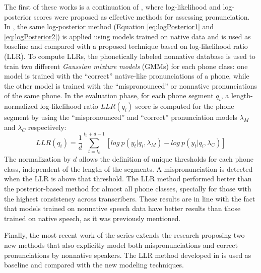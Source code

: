 The first of these works \cite{detection_phone_level_mispronunciation_learning} is
a continuation of \cite{pronunciation_scoring_phone_segments_instruction},
where log-likelihood and log-posterior scores were proposed as effective methods for
assessing pronunciation. In \cite{detection_phone_level_mispronunciation_learning},
the same log-posterior method (Equation \ref{eq:logPosterior1} and \ref{eq:logPosterior2})
is applied using models trained on native
data and is used as baseline and compared with a proposed technique
based on log-likelihood ratio (LLR).
To compute LLRs, the phonetically labeled nonnative
database is used to train two different \textit{Gaussian mixture models} (GMMs) for each phone
class: one model is trained with the ``correct'' native-like pronunciations of a phone, while the
other model is trained with the ``mispronounced'' or nonnative pronunciations of the same phone.
In the evaluation phase, for each phone segment $q_{i}$, a length-normalized log-likelihood ratio
$LLR(q_{i})$ score is computed for the phone segment by using the ``mispronounced'' and ``correct''
pronunciation models $\lambda_{M}$ and $\lambda_{C}$ respectively:
\begin{equation}
\label{eq:logLikelihoodRatio}
LLR(q_{i}) = \frac{1}{d}\sum_{t=t_{0}}^{t_{0}+d-1} [log \ p(y_{t}|q_{i}, \lambda_{M}) - log \ p(y_{t}|q_{i}, \lambda_{C})]
\end{equation}
The normalization by $d$ allows the definition of unique thresholds for each phone class,
independent of the length of the segments. A mispronunciation is detected when the LLR is above that threshold.
The LLR method performed better than the posterior-based method for almost all phone classes,
specially for those with the highest consistency across transcribers. These results are in
line with the fact that models trained on nonnative speech data have better results than
those trained on native speech, as it was previously mentioned.

Finally, the most recent work of the series \cite{main} extends the research
proposing two new methods that also explicitly model both mispronunciations and correct pronunciations
by nonnative speakers. The LLR method developed in
\cite{detection_phone_level_mispronunciation_learning} is used as baseline and compared with
the new modeling techniques.

